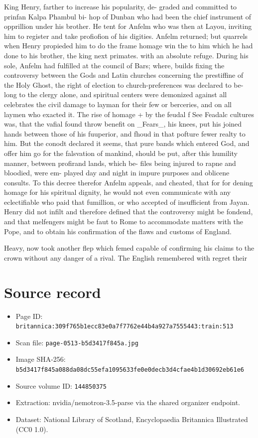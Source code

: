 \documentclass{article}
\begin{document}
King Henry, farther to increase his popularity, de- graded and committed to prinfan Kalpa Phambul bi- hop of Dunban who had been the chief instrument of opprillion under his brother. He tent for Anfelm who was then at Layou, inviting him to register and take profiofion of his digities. Anfelm returned; but quarrels when Henry propieded him to do the frame homage win the to him which he had done to his brother, the king next primates. with an absolute refuge. During his sole, Anfelm had fulfilled at the council of Bars; where, builds fixing the controversy between the Gods and Latin churches concerning the prestiffine of the Holy Ghost, the right of election to church-preferences was declared to be- long to the clergy alone, and spiritual centers were demonized against all celebrates the civil damage to layman for their few or berceries, and on all laymen who exacted it. The rise of homage + by the feudal f See Feadalc cultures was, that the vafial found throw benefit on \_Fears\_, his knees, put his joined hands between those of his fuuperior, and fhoud in that pofture fewer realty to him. But the conodt declared it seems, that pure bands which entered God, and offer him go for the falsvation of mankind, should be put, after this humility manner, between profirand lands, which be- files being injured to rapne and bloodied, were em- played day and night in impure purposes and oblicene consults. To this decree therefor Anfelm appeals, and cheated, that for for dening homage for his spiritual dignity, he would not even communicate with any eclectifiable who paid that fumillion, or who accepted of insufficient from Jayan. Henry did not infilt and therefore defined that the controversy might be fondend, and that melfengers might be faut to Rome to accommodate matters with the Pope, and to obtain his confirmation of the flaws and customs of England.

Heavy, now took another flep which femed capable of confirming his claims to the crown without any danger of a rival. The English remembered with regret their

\section*{Source record}
\begin{itemize}
\item Page ID: \texttt{britannica:309f765b1ecc83e0a7f7762e44b4a927a7555443:train:513}
\item Scan file: \texttt{page-0513-b5d3417f845a.jpg}
\item Image SHA-256: \texttt{b5d3417f845a088da08dc55efa1095633fe0e0decb3d4cfae4b1d30692eb61e6}
\item Source volume ID: \texttt{144850375}
\item Extraction: nvidia/nemotron-3.5-parse via the shared organizer endpoint.
\item Dataset: National Library of Scotland, Encyclopaedia Britannica Illustrated (CC0 1.0).
\end{itemize}
\end{document}
